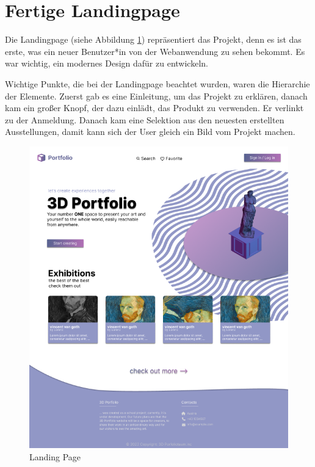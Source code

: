 \section{Fertige Landingpage}
Die Landingpage (siehe Abbildung \ref{fig:impl:finishedLandingpage}) repräsentiert das Projekt, denn es ist das erste, was ein neuer Benutzer*in von der Webanwendung zu sehen bekommt. Es war wichtig, ein modernes Design dafür zu entwickeln.

Wichtige Punkte, die bei der Landingpage beachtet wurden, waren die Hierarchie der Elemente. Zuerst gab es eine Einleitung, um das Projekt zu erklären, danach kam ein großer Knopf, der dazu einlädt, das Produkt zu verwenden. Er verlinkt zu der Anmeldung. Danach kam eine Selektion aus den neuesten erstellten Ausstellungen, damit kann sich der User gleich ein Bild vom Projekt machen.

\begin{figure}[h t]
    \centering
    \includegraphics[scale=.5]{pics/startingpage.png}
    \caption{Landing Page}
    \label{fig:impl:finishedLandingpage}
\end{figure}

